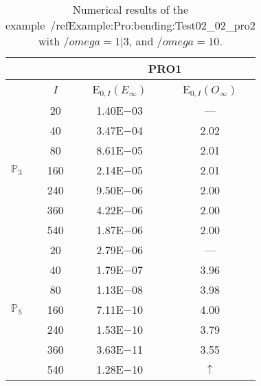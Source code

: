\begin{table}[H]
\caption{Numerical results of the example~/ref{Example:Pro:bending:Test02_02_pro2} with $/omega=1|3$, and $/omega=10$.}
\setlength{\tabcolsep}{5pt}
\centering
\begin{tabular}{@{}l c c c@{}}
\toprule
 &  & \multicolumn{2}{c}{PRO1}\\
\midrule
 & $I$ & E$_{0,I}(E_{\infty})$ & E$_{0,I}(O_{\infty})$\\
\midrule
\multirow{7}{*}{$\mathbb{P}_{3}$}
 & 20 & 1.40E$-$03 & ---\\
 & 40 & 3.47E$-$04 & 2.02\\
 & 80 & 8.61E$-$05 & 2.01\\
 & 160 & 2.14E$-$05 & 2.01\\
 & 240 & 9.50E$-$06 & 2.00\\
 & 360 & 4.22E$-$06 & 2.00\\
 & 540 & 1.87E$-$06 & 2.00\\
\midrule
\multirow{7}{*}{$\mathbb{P}_{5}$}
 & 20 & 2.79E$-$06 & ---\\
 & 40 & 1.79E$-$07 & 3.96\\
 & 80 & 1.13E$-$08 & 3.98\\
 & 160 & 7.11E$-$10 & 4.00\\
 & 240 & 1.53E$-$10 & 3.79\\
 & 360 & 3.63E$-$11 & 3.55\\
 & 540 & 1.28E$-$10 & $\uparrow$\\
\bottomrule
\end{tabular}
\label{Table:PRO:test_02_02_test8_pro2}
\end{table}
